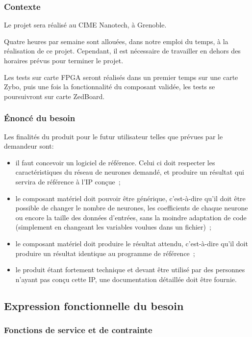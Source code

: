\subsubsection{Contexte}

Le projet sera réalisé au CIME Nanotech, à Grenoble.

Quatre heures par semaine sont allouées, dans notre emploi du temps, à la réalisation de ce projet. Cependant,
il est nécessaire de travailler en dehors des horaires prévus pour terminer
le projet.

Les tests sur carte FPGA seront réalisés dans un premier temps sur une carte Zybo,
puis une fois la fonctionnalité du composant validée, les tests se poursuivront
sur carte ZedBoard.

\subsubsection{Énoncé du besoin}

Les finalités du produit pour le futur utilisateur telles que prévues par le
demandeur sont:
\begin{itemize}
	\item il faut concevoir un logiciel de référence.
		Celui ci doit respecter les caractéristiques du réseau de neurones demandé, et produire un résultat qui servira de référence à l'IP conçue~;
	\item le composant matériel doit pouvoir être générique,
		c'est-à-dire qu'il doit être possible de changer le nombre de
		neurones, les coefficients de chaque neurone
		ou encore la taille des données d'entrées,
		sans la moindre adaptation de code (simplement en changeant les variables voulues dans un fichier)~;
	\item le composant matériel doit produire le résultat attendu, c'est-à-dire qu'il
		doit produire un résultat identique au programme de référence~;
	\item le produit étant fortement technique et devant être utilisé par des personnes n'ayant pas conçu cette IP, une documentation détaillée doit être fournie.
\end{itemize}

\subsection{Expression fonctionnelle du besoin}

\subsubsection{Fonctions de service et de contrainte}

